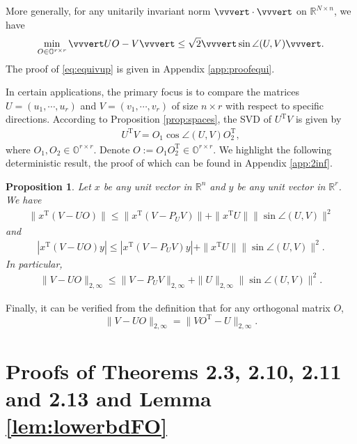 \documentclass[reqno]{amsart}
\newcommand{\T}{\mathrm{T}}
\theoremstyle{plain}
\newtheorem{proposition}[theorem]{Proposition}
\theoremstyle{definition}
\begin{document}
More generally, for any unitarily invariant norm $\vvvert \cdot \vvvert $ on $\mathbb R^{N\times n}$, 
we have 
\begin{equation}\label{eq:equivup}
\min_{O\in \mathbb{O}^{r\times r}} \vvvert UO- V\vvvert \le \sqrt{2}\vvvert \sin\angle (U,V)  \vvvert.
\end{equation}
The proof of \eqref{eq:equivup} is given in Appendix \ref{app:proofequi}. 

In certain applications, the primary focus is to compare the matrices $U=(u_1,\cdots,u_r)$ and $V=(v_1,\cdots,v_r)$ of size $n\times r$ with respect to specific directions. %
According to Proposition \ref{prop:spaces},  the SVD of $U^\T V$ is given by 
\begin{align}\label{eq:svdUV}
U^\T V = O_1 \cos\angle(U,V) O_2^\T,
\end{align}
where $O_1, O_2 \in  \mathbb{O}^{r\times r}$. Denote $O:=O_1 O_2^\T\in  \mathbb{O}^{r\times r}$. We highlight the following deterministic result, the proof of which can be found in Appendix \ref{app:2inf}.
\begin{proposition}\label{prop:2inf}Let $x$ be any unit vector in $\mathbb R^{n}$ and $y$ be any unit vector in $\mathbb R^{r}$. We have
\begin{align*}
\|x^\T (V- UO) \| \le \|x^\T (V - P_U V)\| + \|x^\T U\| \|\sin\angle(U, V)\|^2
\end{align*}
and
\begin{align*}
\left|x^\T (V- UO) y \right| \le \left|x^\T (V- P_U V) y \right| + \| x^\T U\| \|\sin\angle(U, V)\|^2.
\end{align*}
In particular,
\begin{align*}
\|V- UO\|_{2,\infty} \le \|V - P_U V\|_{2,\infty} + \|U\|_{2,\infty} \|\sin\angle(U, V)\|^2.
\end{align*}
\end{proposition}
Finally, it can be verified from the definition that for any orthogonal matrix $O$,
$$\|V- UO\|_{2,\infty}= \|VO^\T- U\|_{2,\infty}.$$


\section{Proofs of Theorems 2.3, 2.10, 2.11 and 2.13  and Lemma \ref{lem:lowerbdFO}} \label{sec:proofmain}
\end{document}
